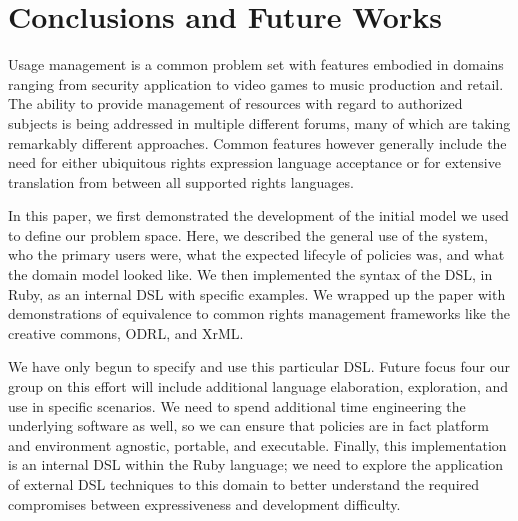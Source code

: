 \section{Conclusions and Future Works}
Usage management is a common problem set with features embodied in domains ranging from security application to video games to music production and retail.  The ability to provide management of resources with regard to authorized subjects is being addressed in multiple different forums, many of which are taking remarkably different approaches.  Common features however generally include the need for either ubiquitous rights expression language acceptance or for extensive translation from between all supported rights languages.

In this paper, we first demonstrated the development of the initial model we used to define our problem space.  Here, we described the general use of the system, who the primary users were, what the expected lifecyle of policies was, and what the domain model looked like.  We then implemented the syntax of the DSL, in Ruby, as an internal DSL with specific examples.  We wrapped up the paper with demonstrations of equivalence to common rights management frameworks like the creative commons, ODRL, and XrML.

We have only begun to specify and use this particular DSL.  Future focus four our group on this effort will include additional language elaboration, exploration, and use in specific scenarios.  We need to spend additional time engineering the underlying software as well, so we can ensure that policies are in fact platform and environment agnostic, portable, and executable.  Finally, this implementation is an internal DSL within the Ruby language; we need to explore the application of external DSL techniques to this domain to better understand the required compromises between expressiveness and development difficulty.